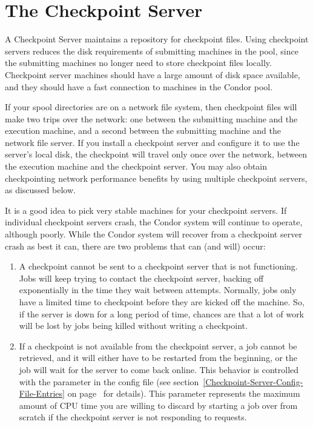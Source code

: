 \section{\label{sec:Ckpt-Server} The Checkpoint Server}

A Checkpoint Server maintains a repository for checkpoint files.
Using checkpoint servers reduces the disk requirements of submitting
machines in the pool, since the submitting machines no longer need to
store checkpoint files locally.
Checkpoint server machines should have a large amount of disk space
available, and they should have a fast connection to machines
in the Condor pool.

If your spool directories are on a network file system, then
checkpoint files will make two trips over the network: one between the
submitting machine and the execution machine, and a second between the
submitting machine and the network file server.
If you install a checkpoint server and configure it to use the
server's local disk, the checkpoint will travel only once over the
network, between the execution machine and the checkpoint server.
You may also obtain checkpointing network performance benefits by
using multiple checkpoint servers, as discussed below.

\Note It is a good idea to pick very stable machines for your checkpoint
servers.
If individual checkpoint servers crash, the Condor system will continue to
operate, although poorly.  
While the Condor system will recover from a checkpoint server crash
as best it can, there are two problems that can (and will) occur:
\begin{enumerate}

\item A checkpoint cannot be sent to a checkpoint server that
is not functioning.
Jobs will keep trying to contact the checkpoint server, backing
off exponentially in the time they wait between attempts.
Normally, jobs only have a limited time to checkpoint before they are
kicked off the machine.
So, if the server is down for a long period of time, chances are that
a lot of work will be lost by jobs being killed without writing a
checkpoint. 

\item If a checkpoint is not available from the checkpoint
server, a job cannot be
retrieved, and it will either have to be restarted from
the beginning, or the job will wait for the server to come back online.
This behavior is controlled with the
 parameter in the config file (see
section~\ref{Checkpoint-Server-Config-File-Entries} on
page~\pageref{Checkpoint-Server-Config-File-Entries} for details).
This parameter represents the maximum amount of CPU time you are
willing to discard by starting a job over from scratch if the
checkpoint server is not responding to requests.

\end{enumerate}

